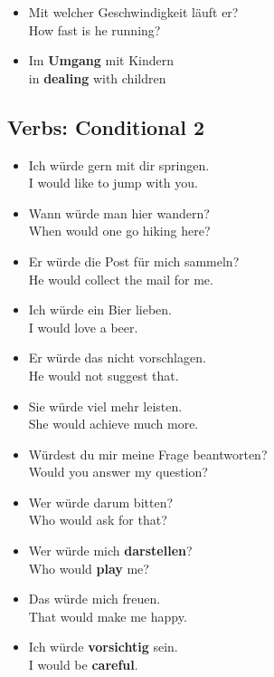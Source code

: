 \begin{itemize}
  \item  Mit welcher Geschwindigkeit l{\"a}uft er? \\
  How fast is he running?
  \item  Im \textbf{Umgang} mit Kindern \\
  in \textbf{dealing} with children
\end{itemize}


\pagebreak
\subsection{Verbs: Conditional 2}

\begin{itemize}
  \item  Ich w{\"u}rde gern mit dir springen. \\
  I would like to jump with you.
  \item  Wann w{\"u}rde man hier wandern? \\
  When would one go hiking here?
  \item  Er w{\"u}rde die Post f{\"u}r mich sammeln? \\
  He would collect the mail for me.
  \item  Ich w{\"u}rde ein Bier lieben. \\
  I would love a beer.
  \item  Er w{\"u}rde das nicht vorschlagen. \\
  He would not suggest that.
  \item  Sie w{\"u}rde viel mehr leisten. \\
  She would achieve much more.
  \item  W{\"u}rdest du mir meine Frage beantworten? \\
  Would you answer my question?
  \item  Wer w{\"u}rde darum bitten? \\
  Who would ask for that?
  \item  Wer w{\"u}rde mich \textbf{darstellen}? \\
  Who would \textbf{play} me?
  \item  Das w{\"u}rde mich freuen. \\
  That would make me happy.
  \item  Ich w{\"u}rde \textbf{vorsichtig} sein. \\
  I would be \textbf{careful}.
\end{itemize}


